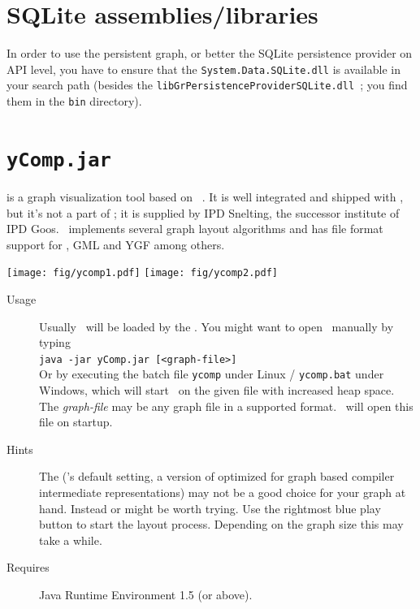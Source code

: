\section{SQLite assemblies/libraries}
In order to use the persistent graph, or better the SQLite persistence provider on API level, you have to ensure that the \texttt{System.Data.SQLite.dll} is available in your search path (besides the \texttt{libGrPersistenceProviderSQLite.dll
}; you find them in the \texttt{bin} directory).

\section{\texttt{yComp.jar}}
\label{tools:ycomp}
\yComp{} \cite{ycomp} is a graph visualization tool based on \yFiles\ \cite{yfiles}.
It is well integrated and shipped with \GrG, but it's not a part of \GrG; it is supplied by IPD Snelting, the successor institute of IPD Goos.%
\yComp\ implements several graph layout algorithms and has file format support for , GML and YGF among others.
\begin{center}
\texttt{[image: fig/ycomp1.pdf]} \texttt{[image: fig/ycomp2.pdf]}
\end{center}
\begin{description}
  \item[Usage] Usually \yComp\ will be loaded by the \GrShell. You might want to open \yComp\ manually by typing\\
   \texttt{java -jar yComp.jar [<graph-file>]}\\
  Or by executing the batch file \texttt{ycomp} under Linux / \texttt{ycomp.bat} under Windows,
  which will start \yComp\ on the given file with increased heap space.
  The \emph{graph-file} may be any graph file in a supported format. \yComp\ will open this file on startup.
  \item[Hints] The   (\yComp's default setting, a version of \texttt{} optimized for graph based compiler intermediate representations) may not be a good choice for your graph at hand.
  Instead \texttt{} or \texttt{} might be worth trying.
  Use the rightmost blue play button to start the layout process. Depending on the graph size this may take a while.
  \item[Requires] Java Runtime Environment 1.5 (or above).
\end{description}
